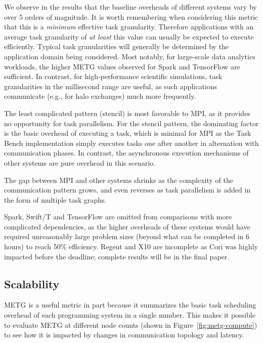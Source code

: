 We observe in the results that the baseline overheads of different
systems vary by over 5 orders of magnitude. It is worth
remembering when considering this metric that this is a \emph{minimum}
effective task granularity. Therefore applications with an average
task granularity of \emph{at least} this value can usually be expected
to execute efficiently. Typical task granularities will
generally be determined by the application domain being
considered. Most notably, for large-scale data analytics workloads, the higher METG values observed for Spark and
TensorFlow are sufficient. In contrast, for high-performance
scientific simulations, task granularities in the millisecond range
are useful, as such applications communicate (e.g., for halo
exchanges) much more frequently.

The least complicated pattern (stencil) is most favorable
to MPI, as it provides no
opportunity for task parallelism. For the stencil pattern, the
dominating factor is the basic overhead of executing a task, which is
minimal for MPI as the Task Bench implementation simply executes tasks one after another in alternation with
communication phases. In contrast, the asynchronous execution
mechanisms of other systems are pure overhead in this scenario.

The gap between MPI and other systems shrinks as the complexity of the
communication pattern grows, and even reverses as task parallelism is
added in the form of multiple task graphs.

Spark, Swift/T and TensorFlow
are omitted from comparisons with more complicated dependencies, as the higher overheads of these systems would have required
unreasonably large problem sizes (beyond what can be completed in 6
hours) to reach 50\% efficiency. Regent and X10 are incomplete as Cori was highly impacted before the deadline; complete results will be in the final paper.

\subsection{Scalability}
\label{subsec:scalability}




METG is a useful metric in part because it summarizes the basic task
scheduling overhead of each programming system in a single number. This makes it
possible to evaluate METG at different node counts (shown in
Figure~\ref{fig:metg-compute}) to see how it is impacted by changes in
communication topology and latency.

